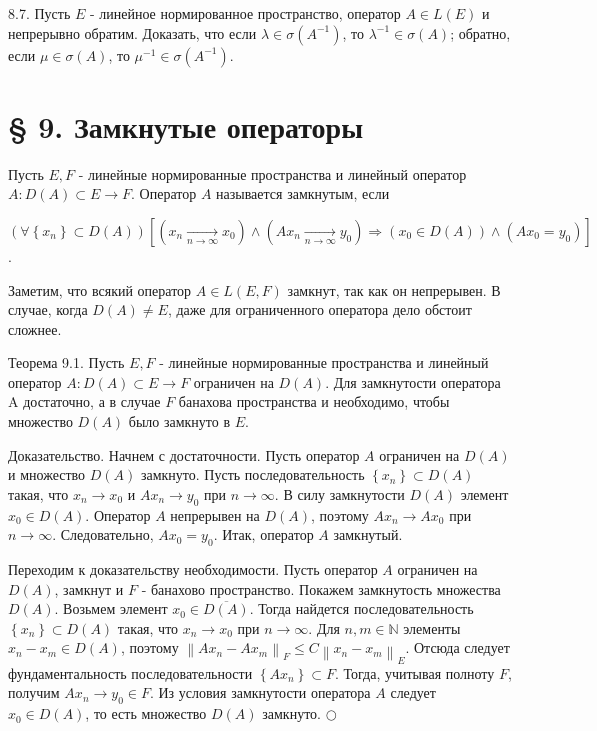 8.7. Пусть $E$ - линейное нормированное пространство, оператор $A \in L(E)$ и непрерывно обратим. Доказать, что если $\lambda \in \sigma\left(A^{-1}\right)$, то $\lambda^{-1} \in \sigma(A)$; обратно, если $\mu \in \sigma(A)$, то $\mu^{-1} \in \sigma\left(A^{-1}\right)$.

\section*{§ 9. Замкнутые операторы}
Пусть $E, F$ - линейные нормированные пространства и линейный оператор $A: D(A) \subset E \rightarrow F$. Оператор $A$ называется замкнутым, если 

$\left(\forall\left\{x_{n}\right\} \subset D(A)\right)\left[\left(x_{n} \underset{n \rightarrow \infty}{\longrightarrow} x_{0}\right) \wedge\left(A x_{n} \underset{n \rightarrow \infty}{\longrightarrow} y_{0}\right) \Rightarrow\left(x_{0} \in D(A)\right) \wedge\left(A x_{0}=y_{0}\right)\right]$.

Заметим, что всякий оператор $A \in L(E, F)$ замкнут, так как он непрерывен. В случае, когда $D(A) \neq E$, даже для ограниченного оператора дело обстоит сложнее.

Теорема 9.1. Пусть $E, F$ - линейные нормированные пространства и линейный оператор $A: D(A) \subset E \rightarrow F$ ограничен на $D(A)$. Для замкнутости оператора A достаточно, а в случае $F$ банахова пространства $и$ необходимо, чтобы множество $D(A)$ было замкнуто в $E$.

Доказательство. Начнем с достаточности. Пусть оператор $A$ ограничен на $D(A)$ и множество $D(A)$ замкнуто. Пусть последовательность $\left\{x_{n}\right\} \subset D(A)$ такая, что $x_{n} \rightarrow x_{0}$ и $A x_{n} \rightarrow y_{0}$ при $n \rightarrow \infty$. В силу замкнутости $D(A)$ элемент $x_{0} \in D(A)$. Оператор $A$ непрерывен на $D(A)$, поэтому $A x_{n} \rightarrow A x_{0}$ при $n \rightarrow \infty$. Следовательно, $A x_{0}=y_{0}$. Итак, оператор $A$ замкнутый.

Переходим к доказательству необходимости. Пусть оператор $A$ ограничен на $D(A)$, замкнут и $F$ - банахово пространство. Покажем замкнутость множества $D(A)$. Возьмем элемент $x_{0} \in \overline{D(A)}$. Тогда найдется последовательность $\left\{x_{n}\right\} \subset D(A)$ такая, что $x_{n} \rightarrow x_{0}$ при $n \rightarrow \infty$. Для $n, m \in \mathbb{N}$ элементы $x_{n}-x_{m} \in D(A)$, поэтому $\left\|A x_{n}-A x_{m}\right\|_{F} \leq C\left\|x_{n}-x_{m}\right\|_{E}$. Отсюда следует фундаментальность последовательности $\left\{A x_{n}\right\} \subset F$. Тогда, учитывая полноту $F$, получим $A x_{n} \rightarrow y_{0} \in F$. Из условия замкнутости оператора $A$ следует $x_{0} \in D(A)$, то есть множество $D(A)$ замкнуто. $\bigcirc$

